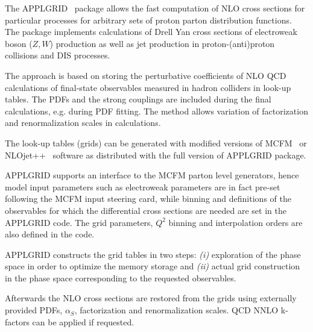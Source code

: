 The APPLGRID~\cite{Carli:2010rw} package allows the fast computation 
of NLO cross sections for particular processes for arbitrary sets of 
proton parton distribution functions. The package implements
calculations of Drell Yan cross sections of electroweak boson (\(Z,W\))
production as well as jet production in proton-(anti)proton
collisions and DIS processes. 

The approach is based on storing the perturbative coefficients
of NLO QCD calculations of final-state observables measured
in hadron colliders in look-up tables. The PDFs and the 
strong couplings are included during the final calculations,
e.g. during PDF fitting. The method allows 
variation of factorization and renormalization scales in
calculations.

The look-up tables (grids) can be generated with modified versions
of MCFM~\cite{Campbell:1999ah,Campbell:2010ff} or 
NLOjet++~\cite{Nagy:2001fj} software as distributed
with the full version of APPLGRID package.

APPLGRID supports an interface to the MCFM parton level generators,
hence model input parameters such as electroweak parameters
are in fact pre-set following the MCFM input steering card, while
binning and definitions of the observables for which the
differential cross sections are needed are set in the 
APPLGRID code. 
The grid parameters, \(Q^2\) binning
and interpolation orders are also defined in the code.

APPLGRID constructs the grid tables in two 
steps: {\it (i)} exploration of the phase space in order
to optimize the memory storage and {\it (ii)} actual grid
construction in the phase space corresponding to the 
requested observables.

Afterwards the NLO cross sections are restored from the grids
using externally provided PDFs, \(\alpha_S\), factorization and 
renormalization scales. QCD NNLO k-factors can be applied
if requested.




